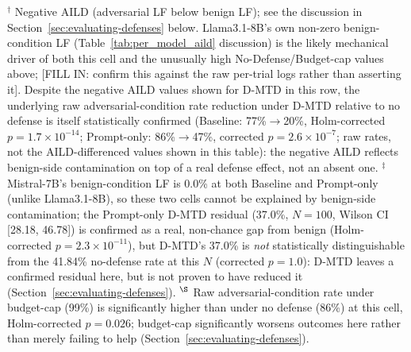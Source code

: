 \documentclass[conference]{IEEEtran}
\begin{document}
\begin{table}[!t]
\raggedright\footnotesize $^\dagger$ Negative AILD (adversarial LF below benign LF); see the discussion in Section~\ref{sec:evaluating-defenses} below. Llama3.1-8B's own non-zero benign-condition LF (Table~\ref{tab:per_model_aild} discussion) is the likely mechanical driver of both this cell and the unusually high No-Defense/Budget-cap values above; [FILL IN: confirm this against the raw per-trial logs rather than asserting it]. Despite the negative AILD values shown for D-MTD in this row, the underlying raw adversarial-condition rate reduction under D-MTD relative to no defense is itself statistically confirmed (Baseline: 77\%$\to$20\%, Holm-corrected $p=1.7\times10^{-14}$; Prompt-only: 86\%$\to$47\%, corrected $p=2.6\times10^{-7}$; raw rates, not the AILD-differenced values shown in this table): the negative AILD reflects benign-side contamination on top of a real defense effect, not an absent one. \quad $^\ddagger$ Mistral-7B's benign-condition LF is 0.0\% at both Baseline and Prompt-only (unlike Llama3.1-8B), so these two cells cannot be explained by benign-side contamination; the Prompt-only D-MTD residual (37.0\%, $N=100$, Wilson CI [28.18, 46.78]) is confirmed as a real, non-chance gap from benign (Holm-corrected $p=2.3\times10^{-11}$), but D-MTD's 37.0\% is \emph{not} statistically distinguishable from the 41.84\% no-defense rate at this $N$ (corrected $p=1.0$): D-MTD leaves a confirmed residual here, but is not proven to have reduced it (Section~\ref{sec:evaluating-defenses}). \quad $^\S$ Raw adversarial-condition rate under budget-cap (99\%) is significantly higher than under no defense (86\%) at this cell, Holm-corrected $p=0.026$; budget-cap significantly worsens outcomes here rather than merely failing to help (Section~\ref{sec:evaluating-defenses}).


\end{table}
%
\end{document}
